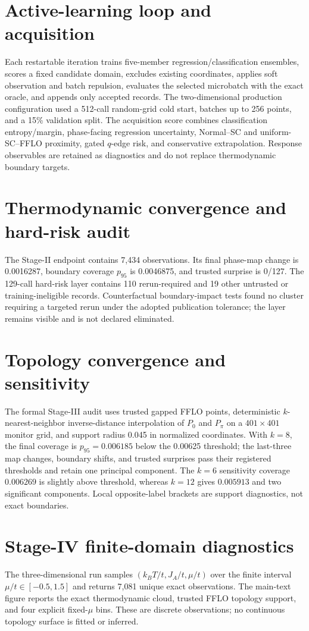 \section{Active-learning loop and acquisition}
Each restartable iteration trains five-member regression/classification
ensembles, scores a fixed candidate domain, excludes existing coordinates,
applies soft observation and batch repulsion, evaluates the selected microbatch
with the exact oracle, and appends only accepted records.  The two-dimensional
production configuration used a 512-call random-grid cold start, batches up to
256 points, and a 15\% validation split.  The acquisition score combines
classification entropy/margin, phase-facing regression uncertainty,
Normal--SC and uniform-SC--FFLO proximity, gated $q$-edge risk, and conservative
extrapolation.  Response observables are retained as diagnostics and do not
replace thermodynamic boundary targets.

\section{Thermodynamic convergence and hard-risk audit}
The Stage-II endpoint contains 7,434 observations.  Its final phase-map change
is 0.0016287, boundary coverage $p_{95}$ is 0.0046875, and trusted surprise is
0/127.  The 129-call hard-risk layer contains 110 rerun-required and 19 other
untrusted or training-ineligible records.  Counterfactual boundary-impact tests
found no cluster requiring a targeted rerun under the adopted publication
tolerance; the layer remains visible and is not declared eliminated.

\section{Topology convergence and sensitivity}
The formal Stage-III audit uses trusted gapped FFLO points, deterministic
$k$-nearest-neighbor inverse-distance interpolation of $P_0$ and $P_\pi$ on a
$401\times401$ monitor grid, and support radius 0.045 in normalized
coordinates.  With $k=8$, the final coverage is $p_{95}=0.006185$ below the
0.00625 threshold; the last-three map changes, boundary shifts, and trusted
surprises pass their registered thresholds and retain one principal component.
The $k=6$ sensitivity coverage $0.006269$ is slightly above threshold, whereas
$k=12$ gives $0.005913$ and two significant components.  Local opposite-label
brackets are support diagnostics, not exact boundaries.

\section{Stage-IV finite-domain diagnostics}
The three-dimensional run samples $(k_BT/t,J_A/t,\mu/t)$ over the finite interval
$\mu/t\in[-0.5,1.5]$ and returns 7,081 unique exact observations.  The main-text
figure reports the exact thermodynamic cloud, trusted FFLO topology support,
and four explicit fixed-$\mu$ bins.  These are discrete observations; no
continuous topology surface is fitted or inferred.

